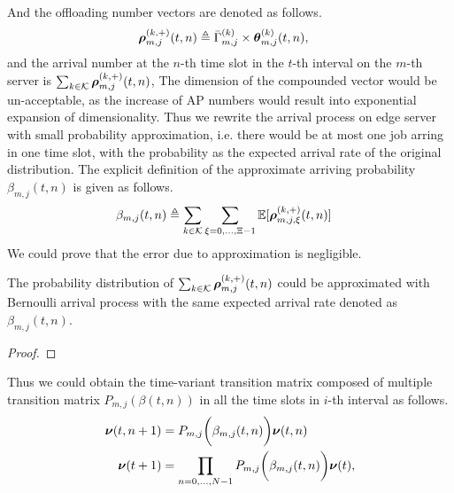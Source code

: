 And the offloading number vectors are denoted as follows.
\begin{align}
    \boldsymbol{\rho}^{(k,+)}_{m,j}({t,n}) &\triangleq \bar{\Gamma}^{(k)}_{m,j} \times \boldsymbol{\theta}^{(k)}_{m,j}({t,n}),
\end{align}
and the arrival number at the $n$-th time slot in the $t$-th interval on the $m$-th server is $\sum_{k\in\mathcal{K}} \boldsymbol{\rho}^{(k,+)}_{m,j}({t,n})$,
The dimension of the compounded vector would be un-acceptable, as the increase of AP numbers would result into exponential expansion of dimensionality.
Thus we rewrite the arrival process on edge server with small probability approximation, i.e. there would be at most one job arring in one time slot, with the probability as the expected arrival rate of the original distribution. The explicit definition of the approximate arriving probability $\beta_{m,j}({t,n})$ is given as follows.
\begin{align}
    {\beta}_{m,j}({t,n}) &\triangleq \sum_{k\in\mathcal{K}} \sum_{\xi=0,\dots,\Xi-1} \mathbb{E}[\boldsymbol{\rho}^{(k,+)}_{m,j,\xi}({t,n})]
    \label{eqn_0}
\end{align}
We could prove that the error due to approximation is negligible.
\begin{lemma}
    The probability distribution of $\sum_{k\in\mathcal{K}} \boldsymbol{\rho}^{(k,+)}_{m,j}({t,n})$ could be approximated with Bernoulli arrival process with the same expected arrival rate denoted as ${\beta}_{m,j}({t,n})$.
\end{lemma}
\begin{proof}
\end{proof}

Thus we could obtain the time-variant transition matrix composed of multiple transition matrix $P_{m,j}(\beta({t,n}))$ in all the time slots in $i$-th interval as follows.
\begin{align}
    \boldsymbol{\nu}({t,n+1}) &= P_{m,j}\bigg(\beta_{m,j}({t,n})\bigg) \boldsymbol{\nu}({t,n})
    \\
    \boldsymbol{\nu}({t+1}) &= \prod_{n=0,\dots,N-1} P_{m,j}\bigg(\beta_{m,j}({t,n})\bigg) \boldsymbol{\nu}({t}),
    \label{eqn_4}
\end{align}

